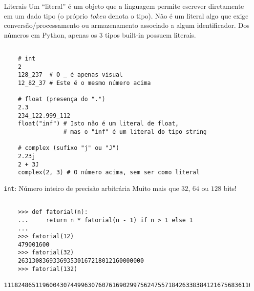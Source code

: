 \documentclass[utf8]{beamer}
\begin{document}
\begin{frame}[fragile]{Literais}
  Um ``literal'' é um objeto que a linguagem permite escrever
  diretamente em um dado tipo (o próprio \emph{token} denota o tipo).
  Não é um literal algo que exige conversão/processamento
  ou armazenamento associado a algum identificador.
  Dos números em Python, apenas os $3$ tipos built-in possuem literais.

  \begin{verbatim}

    # int
    2
    128_237  # O _ é apenas visual
    12_82_37 # Este é o mesmo número acima

    # float (presença do ".")
    2.3
    234_122.999_112
    float("inf") # Isto não é um literal de float,
                 # mas o "inf" é um literal do tipo string

    # complex (sufixo "j" ou "J")
    2.23j
    2 + 3J
    complex(2, 3) # O número acima, sem ser como literal

  \end{verbatim}

\end{frame}


\begin{frame}[fragile]{\texttt{int}:
                       Número inteiro de precisão arbitrária}
  Muito mais que $32$, $64$ ou $128$ bits!

  \begin{verbatim}

    >>> def fatorial(n):
    ...     return n * fatorial(n - 1) if n > 1 else 1
    ...
    >>> fatorial(12)
    479001600
    >>> fatorial(32)
    263130836933693530167218012160000000
    >>> fatorial(132)
    111824865119600430744996307607616902997562475571842633838412167568361169672820118454045730260688510087990927196104962685462595837360336094267205134948250389032461924909766607715924086489297715200000000000000000000000000000000

  \end{verbatim}

\end{frame}
\end{document}
